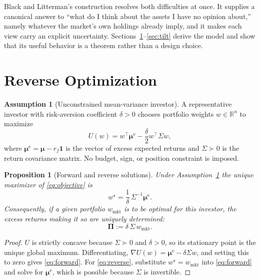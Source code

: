 \documentclass[11pt]{article}
\newtheorem{proposition}{Proposition}
\theoremstyle{remark}
\theoremstyle{definition}
\newtheorem{assumption}{Assumption}
\begin{document}
Black and Litterman's construction resolves both difficulties at once. It supplies a canonical answer to ``what do I think about the assets I have no opinion about,'' namely whatever the market's own holdings already imply, and it makes each view carry an explicit uncertainty. Sections~\ref{sec:reverse}--\ref{sec:tilt} derive the model and show that its useful behavior is a theorem rather than a design choice.

\section{Reverse Optimization}
\label{sec:reverse}

\begin{assumption}[Unconstrained mean-variance investor]
\label{ass:mv}
A representative investor with risk-aversion coefficient $\delta > 0$ chooses portfolio weights $w \in \mathbb{R}^n$ to maximize
\begin{equation}
\label{eq:objective}
U(w) = w^\top \boldsymbol\mu^{\mathrm{e}} - \frac{\delta}{2} w^\top \Sigma w,
\end{equation}
where $\boldsymbol\mu^{\mathrm{e}} = \boldsymbol\mu - r_f\mathbf{1}$ is the vector of excess expected returns and $\Sigma \succ 0$ is the return covariance matrix. No budget, sign, or position constraint is imposed.
\end{assumption}

\begin{proposition}[Forward and reverse solutions]
\label{prop:reverse}
Under Assumption~\ref{ass:mv} the unique maximizer of \eqref{eq:objective} is
\begin{equation}
\label{eq:forward}
w^\star = \frac{1}{\delta}\,\Sigma^{-1}\boldsymbol\mu^{\mathrm{e}}.
\end{equation}
Consequently, if a given portfolio $w_{\mathrm{mkt}}$ is to be optimal for this investor, the excess returns making it so are uniquely determined:
\begin{equation}
\label{eq:reverse}
\boldsymbol\Pi := \delta\,\Sigma\,w_{\mathrm{mkt}}.
\end{equation}
\end{proposition}

\begin{proof}
$U$ is strictly concave because $\Sigma \succ 0$ and $\delta > 0$, so its stationary point is the unique global maximum. Differentiating, $\nabla U(w) = \boldsymbol\mu^{\mathrm{e}} - \delta\Sigma w$, and setting this to zero gives \eqref{eq:forward}. For \eqref{eq:reverse}, substitute $w^\star = w_{\mathrm{mkt}}$ into \eqref{eq:forward} and solve for $\boldsymbol\mu^{\mathrm{e}}$, which is possible because $\Sigma$ is invertible.
\end{proof}
\end{document}

